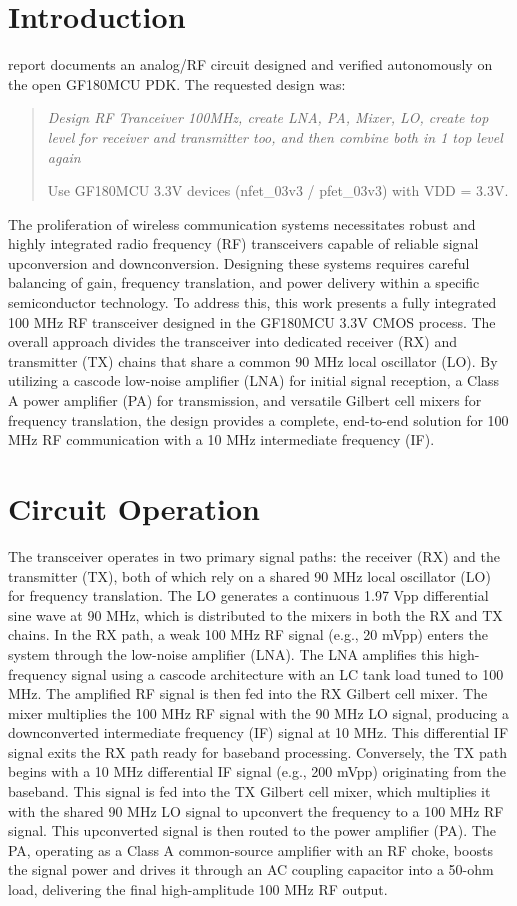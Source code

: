 \documentclass{ieeeaccess}
\begin{document}
\section{Introduction}
 report documents an analog/RF circuit designed and verified autonomously on the open GF180MCU PDK. The requested design was:
\begin{quote}\itshape Design RF Tranceiver 100MHz, create LNA, PA, Mixer, LO, create top level for receiver and transmitter too, and then combine both in 1 top level again

Use GF180MCU 3.3V devices (nfet\_03v3 / pfet\_03v3) with VDD = 3.3V.\end{quote}
The proliferation of wireless communication systems necessitates robust and highly integrated radio frequency (RF) transceivers capable of reliable signal upconversion and downconversion. Designing these systems requires careful balancing of gain, frequency translation, and power delivery within a specific semiconductor technology. To address this, this work presents a fully integrated 100 MHz RF transceiver designed in the GF180MCU 3.3V CMOS process. The overall approach divides the transceiver into dedicated receiver (RX) and transmitter (TX) chains that share a common 90 MHz local oscillator (LO). By utilizing a cascode low-noise amplifier (LNA) for initial signal reception, a Class A power amplifier (PA) for transmission, and versatile Gilbert cell mixers for frequency translation, the design provides a complete, end-to-end solution for 100 MHz RF communication with a 10 MHz intermediate frequency (IF).
\section{Circuit Operation}
The transceiver operates in two primary signal paths: the receiver (RX) and the transmitter (TX), both of which rely on a shared 90 MHz local oscillator (LO) for frequency translation. The LO generates a continuous 1.97 Vpp differential sine wave at 90 MHz, which is distributed to the mixers in both the RX and TX chains.
In the RX path, a weak 100 MHz RF signal (e.g., 20 mVpp) enters the system through the low-noise amplifier (LNA). The LNA amplifies this high-frequency signal using a cascode architecture with an LC tank load tuned to 100 MHz. The amplified RF signal is then fed into the RX Gilbert cell mixer. The mixer multiplies the 100 MHz RF signal with the 90 MHz LO signal, producing a downconverted intermediate frequency (IF) signal at 10 MHz. This differential IF signal exits the RX path ready for baseband processing.
Conversely, the TX path begins with a 10 MHz differential IF signal (e.g., 200 mVpp) originating from the baseband. This signal is fed into the TX Gilbert cell mixer, which multiplies it with the shared 90 MHz LO signal to upconvert the frequency to a 100 MHz RF signal. This upconverted signal is then routed to the power amplifier (PA). The PA, operating as a Class A common-source amplifier with an RF choke, boosts the signal power and drives it through an AC coupling capacitor into a 50-ohm load, delivering the final high-amplitude 100 MHz RF output.
\end{document}
